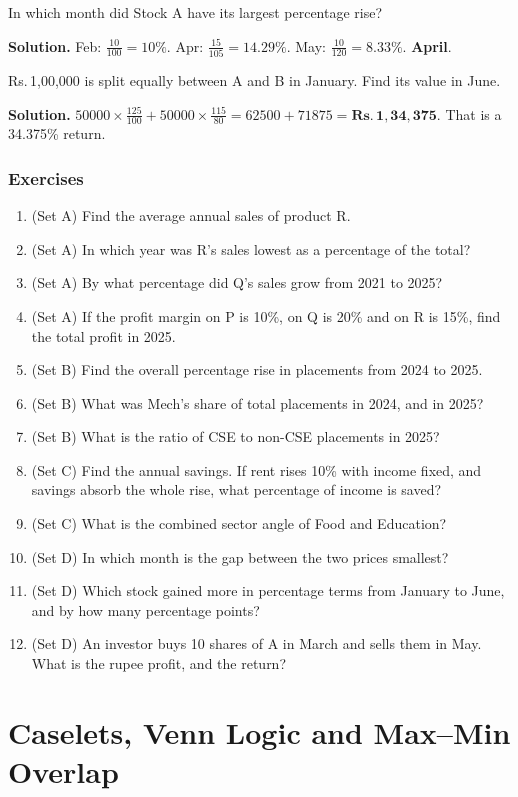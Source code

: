 \documentclass[11pt,a4paper,openany]{report}
\newenvironment{exercises}{\subsection*{Exercises \thechapter}\begin{enumerate}[label=\textbf{\thechapter.\arabic*},leftmargin=3.2em]}{\end{enumerate}}
\newcommand{\Rs}{Rs.\,}
\begin{document}
\begin{example}
In which month did Stock A have its largest percentage rise?

\textbf{Solution.} Feb: $\frac{10}{100}=10\%$. Apr: $\frac{15}{105}=14.29\%$. May: $\frac{10}{120}=8.33\%$. \textbf{April}.
\end{example}

\begin{example}
\Rs1,00,000 is split equally between A and B in January. Find its value in June.

\textbf{Solution.} $50000\times\frac{125}{100}+50000\times\frac{115}{80}=62500+71875=\mathbf{\Rs1,34,375}$. That is a 34.375\% return.
\end{example}

\begin{exercises}
\item (Set A) Find the average annual sales of product R.
\item (Set A) In which year was R's sales lowest as a percentage of the total?
\item (Set A) By what percentage did Q's sales grow from 2021 to 2025?
\item (Set A) If the profit margin on P is 10\%, on Q is 20\% and on R is 15\%, find the total profit in 2025.
\item (Set B) Find the overall percentage rise in placements from 2024 to 2025.
\item (Set B) What was Mech's share of total placements in 2024, and in 2025?
\item (Set B) What is the ratio of CSE to non-CSE placements in 2025?
\item (Set C) Find the annual savings. If rent rises 10\% with income fixed, and savings absorb the whole rise, what percentage of income is saved?
\item (Set C) What is the combined sector angle of Food and Education?
\item (Set D) In which month is the gap between the two prices smallest?
\item (Set D) Which stock gained more in percentage terms from January to June, and by how many percentage points?
\item (Set D) An investor buys 10 shares of A in March and sells them in May. What is the rupee profit, and the return?
\end{exercises}

\chapter{Caselets, Venn Logic and Max--Min Overlap}\label{ch:case}
\end{document}
